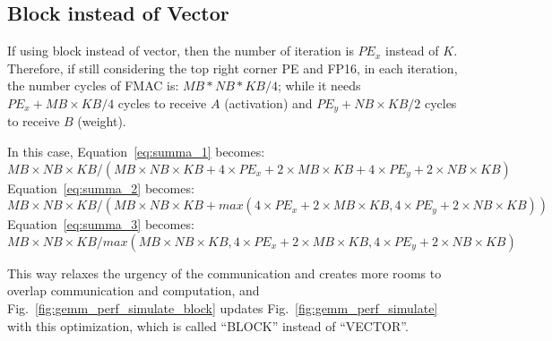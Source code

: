 
\subsection{Block instead of Vector}

If using block instead of vector, then the number of iteration is $PE_x$ instead of $K$.
%
Therefore, if still considering the top right corner PE and FP16, in each iteration, the number cycles of FMAC is: $MB * NB * KB / 4$; while it needs $PE_x+MB \times KB/4$ cycles to receive $A$ (activation) and $PE_y+NB \times KB/2$ cycles to receive $B$ (weight).


In this case, Equation~\ref{eq:summa_1} becomes:
\begin{equation}
  MB \times NB \times KB/(MB \times NB \times KB +4 \times PE_x + 2 \times MB \times KB+4 \times PE_y + 2 \times NB \times KB)
  \label{eq:summa_4}
\end{equation}
%
Equation~\ref{eq:summa_2} becomes:
\begin{equation}
  MB \times NB \times KB/(MB \times NB \times KB +max(4 \times PE_x + 2 \times MB \times KB, 4 \times PE_y + 2 \times NB \times KB))
  \label{eq:summa_5}
\end{equation}
%
Equation~\ref{eq:summa_3} becomes:
\begin{equation}
  MB \times NB \times KB/max(MB \times NB \times KB, 4 \times PE_x + 2 \times MB \times KB, 4 \times PE_y + 2 \times NB \times KB)
  \label{eq:summa_6}
\end{equation}

This way relaxes the urgency of the communication and creates more rooms to overlap communication and computation, and Fig.~\ref{fig:gemm_perf_simulate_block} updates Fig.~\ref{fig:gemm_perf_simulate} with this optimization, which is called ``BLOCK'' instead of ``VECTOR''.


